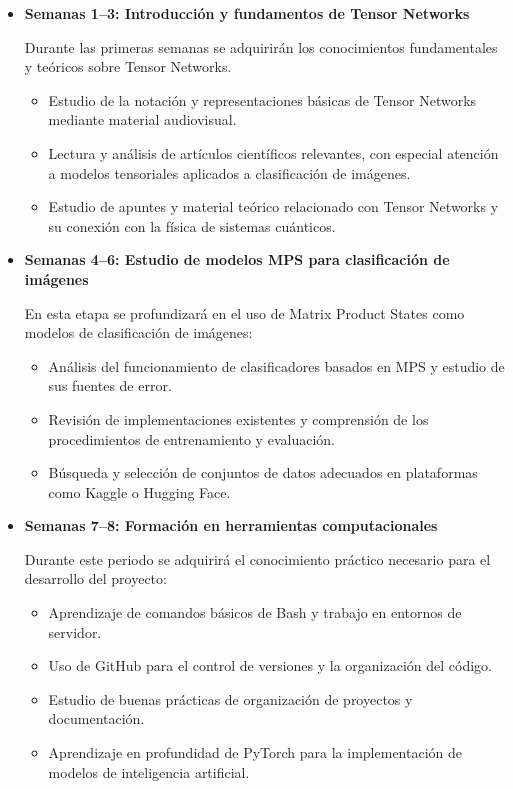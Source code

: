 \documentclass[11pt,a4paper]{report}
\begin{document}
\begin{itemize}
\item \textbf{Semanas 1--3: Introducción y fundamentos de Tensor Networks}

Durante las primeras semanas se adquirirán los conocimientos fundamentales y teóricos sobre Tensor Networks. 
\begin{itemize}
\item Estudio de la notación y representaciones básicas de Tensor Networks mediante material audiovisual.
\item Lectura y análisis de artículos científicos relevantes, con especial atención a modelos tensoriales aplicados a clasificación de imágenes.
\item Estudio de apuntes y material teórico relacionado con Tensor Networks y su conexión con la física de sistemas cuánticos.
\end{itemize}

\item \textbf{Semanas 4--6: Estudio de modelos MPS para clasificación de imágenes}

En esta etapa se profundizará en el uso de Matrix Product States como modelos de clasificación de imágenes:
\begin{itemize}
\item Análisis del funcionamiento de clasificadores basados en MPS y estudio de sus fuentes de error.
\item Revisión de implementaciones existentes y comprensión de los procedimientos de entrenamiento y evaluación.
\item Búsqueda y selección de conjuntos de datos adecuados en plataformas como Kaggle o Hugging Face.
\end{itemize}

\item \textbf{Semanas 7--8: Formación en herramientas computacionales}

Durante este periodo se adquirirá el conocimiento práctico necesario para el desarrollo del proyecto:
\begin{itemize}
\item Aprendizaje de comandos básicos de Bash y trabajo en entornos de servidor.
\item Uso de GitHub para el control de versiones y la organización del código.
\item Estudio de buenas prácticas de organización de proyectos y documentación.
\item Aprendizaje en profundidad de PyTorch para la implementación de modelos de inteligencia artificial.
\end{itemize}


\end{itemize}
\end{document}
